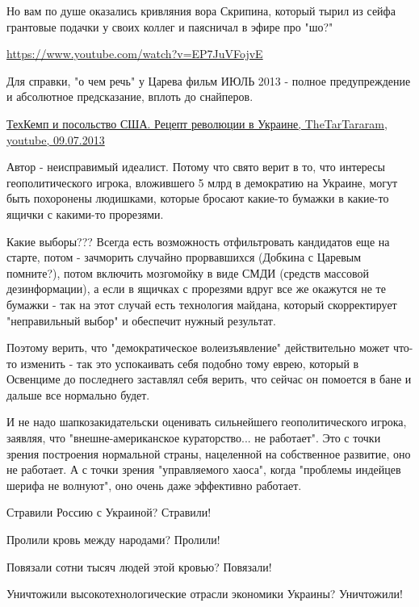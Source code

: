 \begin{itemize}
\begin{itemize}
Но вам по душе оказались кривляния вора Скрипина, который тырил из сейфа
грантовые подачки у своих коллег и паясничал в эфире про "шо?"

\url{https://www.youtube.com/watch?v=EP7JuVFojvE}

Для справки, "о чем речь" у Царева фильм ИЮЛЬ 2013 - полное предупреждение и
абсолютное предсказание, вплоть до снайперов.

\href{https://www.youtube.com/watch?v=uTKZYTLDnv8}{%
ТехКемп и посольство США. Рецепт революции в Украине, TheTarTararam, youtube, 09.07.2013%
}

\end{itemize} %


Автор - неисправимый идеалист. Потому что свято верит в то, что интересы
геополитического игрока, вложившего 5 млрд в демократию на Украине, могут быть
похоронены людишками, которые бросают какие-то бумажки в какие-то ящички с
какими-то прорезями.

Какие выборы??? Всегда есть возможность отфильтровать кандидатов еще на старте,
потом - зачморить случайно прорвавшихся (Добкина с Царевым помните?), потом
включить мозгомойку в виде СМДИ (средств массовой дезинформации), а если в
ящичках с прорезями вдруг все же окажутся не те бумажки - так на этот случай
есть технология майдана, который скорректирует "неправильный выбор" и обеспечит
нужный результат.

Поэтому верить, что "демократическое волеизъявление" действительно может что-то
изменить - так это успокаивать себя подобно тому еврею, который в Освенциме до
последнего заставлял себя верить, что сейчас он помоется в бане и дальше все
нормально будет.

И не надо шапкозакидательски оценивать сильнейшего геополитического игрока,
заявляя, что "внешне-американское кураторство... не работает". Это с точки
зрения построения нормальной страны, нацеленной на собственное развитие, оно не
работает. А с точки зрения "управляемого хаоса", когда "проблемы индейцев
шерифа не волнуют", оно очень даже эффективно работает.

Стравили Россию с Украиной? Стравили!

Пролили кровь между народами? Пролили!

Повязали сотни тысяч людей этой кровью? Повязали!

Уничтожили высокотехнологические отрасли экономики Украины? Уничтожили!


\end{itemize}
